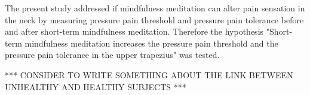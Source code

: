The present study addressed if mindfulness meditation can alter pain sensation in the neck by measuring pressure pain threshold and pressure pain tolerance before and after short-term mindfulness meditation.
Therefore the hypothesis "Short-term mindfulness meditation increases the pressure pain threshold and the pressure pain tolerance in the upper trapezius" was tested.

*** CONSIDER TO WRITE SOMETHING ABOUT THE LINK BETWEEN UNHEALTHY AND HEALTHY SUBJECTS ***
